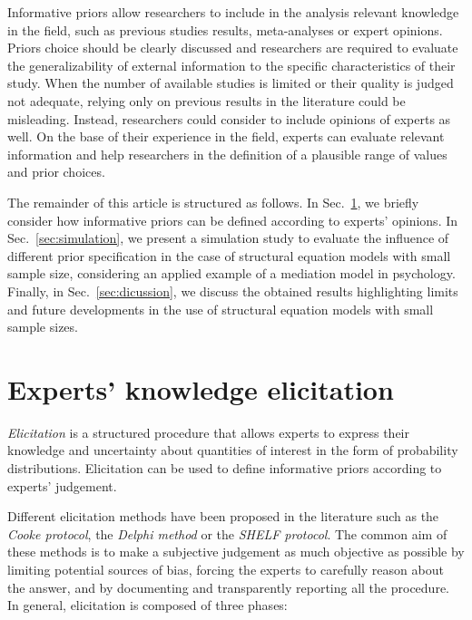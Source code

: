 \documentclass[graybox]{svmult}
\begin{document}
Informative priors allow researchers to include in the analysis relevant knowledge in the field, such as previous studies results, meta-analyses or expert opinions. Priors choice should be clearly discussed and researchers are required to evaluate the generalizability of external information to the specific characteristics of their study. When the number of available studies is limited or their quality is judged not adequate, relying only on previous results in the literature could be misleading. Instead, researchers could consider to include opinions of experts as well. On the base of their experience in the field, experts can evaluate relevant information and help researchers in the definition of a plausible range of values and prior choices.

The remainder of this article is structured as follows. In Sec.~\ref{sec:expert_elicitation}, we briefly consider how informative priors can be defined according to experts' opinions. In Sec.~\ref{sec:simulation}, we present a simulation study to evaluate the influence of different prior specification in the case of structural equation models with small sample size, considering an applied example of a mediation model in psychology. Finally, in Sec.~\ref{sec:dicussion}, we discuss the obtained results highlighting limits and future developments in the use of structural equation models with small sample sizes.

\section{Experts' knowledge elicitation}
\label{sec:expert_elicitation}

\emph{Elicitation} is a structured procedure that allows experts to express their knowledge and uncertainty about quantities of interest in the form of probability distributions. Elicitation can be used to define informative priors according to  experts' judgement.

Different elicitation methods have been proposed in the literature such as the \emph{Cooke protocol}, the \emph{Delphi method} or the \emph{SHELF protocol}. The common aim of these methods is to make a subjective judgement as much objective as possible by limiting potential sources of bias, forcing the experts to carefully reason about the answer, and by documenting and transparently reporting all the procedure. In general, elicitation is composed of three phases:
\end{document}
